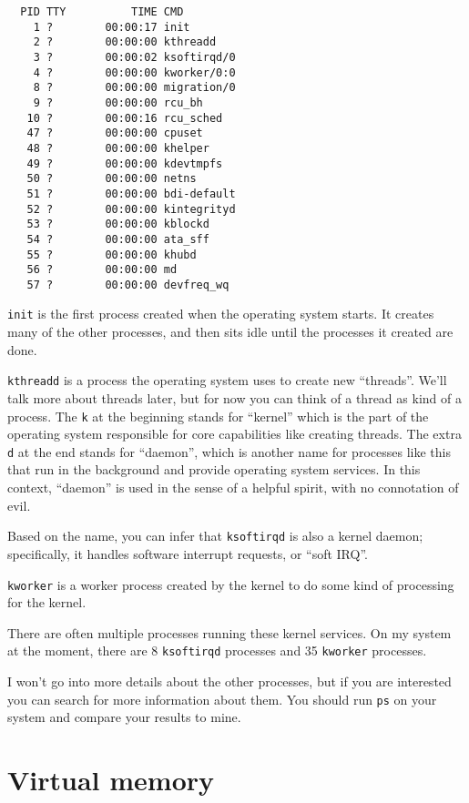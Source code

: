 \documentclass[12pt]{book}
\begin{document}
\begin{verbatim}
  PID TTY          TIME CMD
    1 ?        00:00:17 init
    2 ?        00:00:00 kthreadd
    3 ?        00:00:02 ksoftirqd/0
    4 ?        00:00:00 kworker/0:0
    8 ?        00:00:00 migration/0
    9 ?        00:00:00 rcu_bh
   10 ?        00:00:16 rcu_sched
   47 ?        00:00:00 cpuset
   48 ?        00:00:00 khelper
   49 ?        00:00:00 kdevtmpfs
   50 ?        00:00:00 netns
   51 ?        00:00:00 bdi-default
   52 ?        00:00:00 kintegrityd
   53 ?        00:00:00 kblockd
   54 ?        00:00:00 ata_sff
   55 ?        00:00:00 khubd
   56 ?        00:00:00 md
   57 ?        00:00:00 devfreq_wq
\end{verbatim}

{\tt init} is the first process created when the operating system
starts.  It creates many of the other processes, and then sits idle
until the processes it created are done.

{\tt kthreadd} is a process the operating system uses to create new
``threads''.  We'll talk more about threads later, but for now you can
think of a thread as kind of a process.  The {\tt k} at the beginning
stands for ``kernel'' which is the part of the operating system
responsible for core capabilities like creating threads.  The extra
{\tt d} at the end stands for ``daemon'', which is another name for
processes like this that run in the background and provide operating
system services.  In this context, ``daemon'' is used in the
sense of a helpful spirit, with no connotation of evil.

Based on the name, you can infer that {\tt ksoftirqd} is also a kernel
daemon; specifically, it handles software interrupt requests, or
``soft IRQ''.

{\tt kworker} is a worker process created by the kernel to do some
kind of processing for the kernel.

There are often multiple processes running these kernel services.
On my system at the moment, there are 8 {\tt ksoftirqd} processes
and 35 {\tt kworker} processes.

I won't go into more details about the other processes, but if you
are interested you can search for more information about them.
You should run {\tt ps} on your system and compare your results
to mine.



\chapter{Virtual memory}
\end{document}
